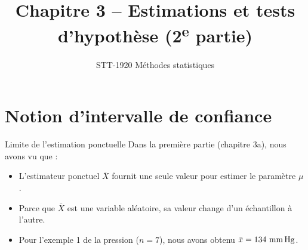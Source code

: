 \documentclass{BeamerTemplate}
\title{Chapitre 3 -- Estimations et tests d'hypothèse (2\textsuperscript{e} partie)}
\subtitle{STT-1920 Méthodes statistiques}
\date{}
\begin{document}
\begin{frame}[t]
  \titlepage
\end{frame}

\section{Notion d'intervalle de confiance}

\begin{frame}[t]{Limite de l'estimation ponctuelle}
  Dans la première partie (chapitre 3a), nous avons vu que :
  \begin{itemize}\itemsep 2mm
    \item L'estimateur ponctuel $\overline{X}$ fournit \alert{une seule valeur} pour estimer le paramètre $\mu$.
    \item Parce que $\overline{X}$ est une variable aléatoire, sa valeur change d'un échantillon à l'autre.
    \item Pour l'exemple 1 de la pression ($n=7$), nous avons obtenu $\bar{x} = 134\text{ mm\,Hg}$.
  \end{itemize}


  \vspace{-2mm}
\end{frame}
\end{document}
